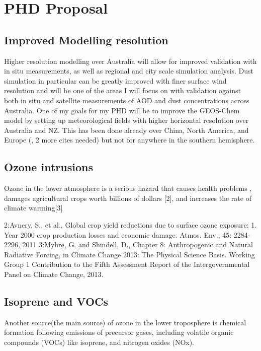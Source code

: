\section{PHD Proposal}

\subsection{Improved Modelling resolution}
Higher resolution modelling over Australia will allow for improved validation with in situ measurements, as well as regional and city scale simulation analysis. 
Dust simulation in particular can be greatly improved with finer surface wind resolution and will be one of the areas I will focus on with validation against both in situ and satellite measurements of AOD and dust concentrations across Australia.
One of my goals for my PHD will be to improve the GEOS-Chem model by setting up meteorological fields with higher horizontal resolution over Australia and NZ.
This has been done already over China, North America, and Europe (\cite{Chen_2009}, 2 more cites needed) but not for anywhere in the southern hemisphere.

\subsection{Ozone intrusions}
Ozone in the lower atmosphere is a serious hazard that causes health problems \cite{Hsieh_2013}, damages agricultural crops worth billions of dollars [2], and increases the rate of climate warming[3]



2:Avnery, S., et al., Global crop yield reductions due to surface ozone exposure: 1. Year 2000 crop production losses and economic damage. Atmos. Env., 45: 2284-2296, 2011
3:Myhre, G. and Shindell, D., Chapter 8: Anthropogenic and Natural Radiative Forcing, in Climate Change 2013: The Physical Science
Basis. Working Group 1 Contribution to the Fifth Assessment Report of the Intergovernmental Panel on Climate Change, 2013.

\subsection{Isoprene and VOCs}
Another source(the main source) of ozone in the lower troposphere is chemical formation following emissions of precursor gases, including volatile organic compounds (VOCs) like isoprene, and nitrogen oxides (NOx).
